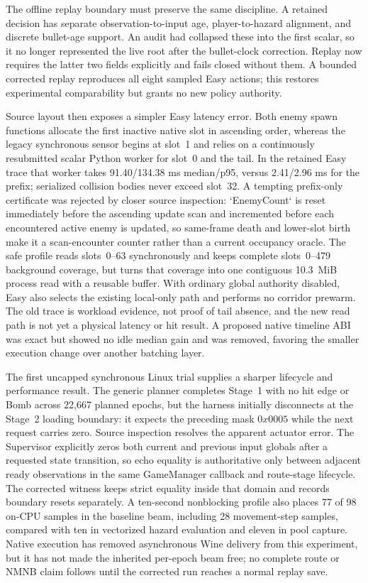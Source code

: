 \documentclass[10pt]{article}
\begin{document}
The offline replay boundary must preserve the same discipline.  A retained
decision has separate observation-to-input age, player-to-hazard alignment,
and discrete bullet-age support.  An audit had collapsed these into the first
scalar, so it no longer represented the live root after the bullet-clock
correction.  Replay now requires the latter two fields explicitly and fails
closed without them.  A bounded corrected replay reproduces all eight sampled
Easy actions; this restores experimental comparability but grants no new
policy authority.

Source layout then exposes a simpler Easy latency error.  Both enemy spawn
functions allocate the first inactive native slot in ascending order, whereas
the legacy synchronous sensor begins at slot~1 and relies on a continuously
resubmitted scalar Python worker for slot~0 and the tail.  In the retained Easy
trace that worker takes 91.40/134.38 ms median/p95, versus 2.41/2.96 ms for the
prefix; serialized collision bodies never exceed slot~32.  A tempting
prefix-only certificate was rejected by closer source inspection:
`EnemyCount` is reset immediately before the ascending update scan and
incremented before each encountered active enemy is updated, so same-frame
death and lower-slot birth make it a scan-encounter counter rather than a
current occupancy oracle.  The safe profile reads slots~0--63 synchronously
and keeps complete slots~0--479 background coverage, but turns that coverage
into one contiguous 10.3~MiB process read with a reusable buffer.  With
ordinary global authority disabled, Easy also selects the existing local-only
path and performs no corridor prewarm.  The old trace is workload evidence,
not proof of tail absence, and the new read path is not yet a physical latency
or hit result.  A proposed native timeline ABI was exact but showed no idle
median gain and was removed, favoring the smaller execution change over
another batching layer.

The first uncapped synchronous Linux trial supplies a sharper lifecycle and
performance result.  The generic planner completes Stage~1 with no hit edge or
Bomb across 22,667 planned epochs, but the harness initially disconnects at the
Stage~2 loading boundary: it expects the preceding mask $0x0005$ while the next
request carries zero.  Source inspection resolves the apparent actuator error.
The Supervisor explicitly zeros both current and previous input globals after
a requested state transition, so echo equality is authoritative only between
adjacent ready observations in the same GameManager callback and route-stage
lifecycle.  The corrected witness keeps strict equality inside that domain and
records boundary resets separately.  A ten-second nonblocking profile also
places 77 of 98 on-CPU samples in the baseline beam, including 28 movement-step
samples, compared with ten in vectorized hazard evaluation and eleven in pool
capture.  Native execution has removed asynchronous Wine delivery from this
experiment, but it has not made the inherited per-epoch beam free; no complete
route or NMNB claim follows until the corrected run reaches a normal replay
save.
\end{document}
